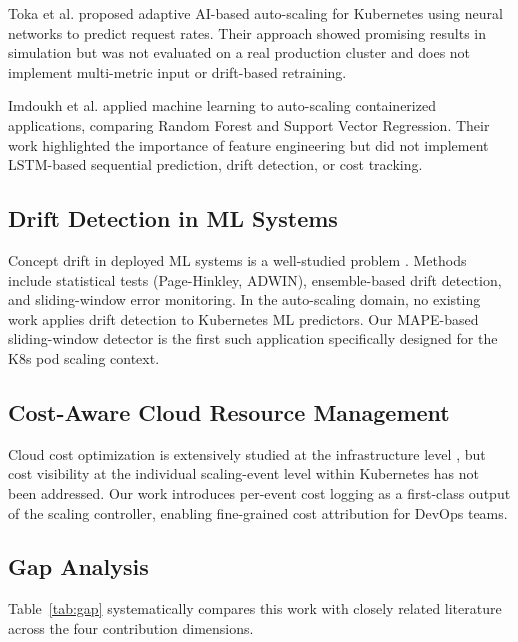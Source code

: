 \documentclass[journal]{IEEEtran}
\begin{document}
Toka et al. \cite{toka2021} proposed adaptive AI-based auto-scaling for Kubernetes using neural networks to predict request rates. Their approach showed promising results in simulation but was not evaluated on a real production cluster and does not implement multi-metric input or drift-based retraining.

Imdoukh et al. \cite{imdoukh2020} applied machine learning to auto-scaling containerized applications, comparing Random Forest and Support Vector Regression. Their work highlighted the importance of feature engineering but did not implement LSTM-based sequential prediction, drift detection, or cost tracking.

\subsection{Drift Detection in ML Systems}
Concept drift in deployed ML systems is a well-studied problem \cite{gama2014}. Methods include statistical tests (Page-Hinkley, ADWIN), ensemble-based drift detection, and sliding-window error monitoring. In the auto-scaling domain, no existing work applies drift detection to Kubernetes ML predictors. Our MAPE-based sliding-window detector is the first such application specifically designed for the K8s pod scaling context.

\subsection{Cost-Aware Cloud Resource Management}
Cloud cost optimization is extensively studied at the infrastructure level \cite{lin2020}, but cost visibility at the individual scaling-event level within Kubernetes has not been addressed. Our work introduces per-event cost logging as a first-class output of the scaling controller, enabling fine-grained cost attribution for DevOps teams.

\subsection{Gap Analysis}
Table~\ref{tab:gap} systematically compares this work with closely related literature across the four contribution dimensions.
\end{document}
